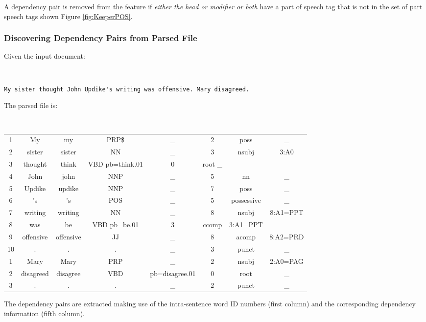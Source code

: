 \documentclass[11pt]{article}
\begin{document}
A dependency pair is removed from the feature if \emph{either the head or modifier or both} have a part of speech tag that is not in the set of part speech tags shown Figure \ref{fig:KeeperPOS}.

\subsubsection{Discovering Dependency Pairs from Parsed File} \label{sec:Discover}


Given the input document:

\begin{shaded} \tt
\begin{verbatim}
My sister thought John Updike's writing was offensive. Mary disagreed.
\end{verbatim}
\end{shaded}

The parsed file is:

\begin{shaded} \tt
\footnotesize
\begin{tabular}{cccccccc}
1 &	My &	my &	PRP\$ &	 \_	& 2	 & poss	 &\_ \\
2 &	sister &	sister &	NN &	\_ &	3 &	nsubj &	3:A0 \\
3 &	thought &	think &	VBD	pb=think.01 &	0 &	root	\_ \\
4 &	John &	john	 &NNP &	\_ &	5 &	nn &	 \_ \\
5 &	Updike &	updike &	 NNP &	\_ &	7 &	poss & \_ \\
6 &	's &	's &	POS	 &\_ &	5 &	possessive &	\_ \\
7 &	writing &	writing &	NN &	\_ &	8 &	nsubj &	8:A1=PPT \\
8 &	was &	be &	VBD	pb=be.01 &	3 &	 ccomp &	3:A1=PPT \\
9 &	offensive &	offensive &	JJ & \_	& 8 &	acomp &	8:A2=PRD \\
10 & 	. & 	. &	. &	\_ &	3 &	punct &	\_ \\

1 &	Mary &	Mary &	PRP	 & \_	 & 2	 & nsubj &	2:A0=PAG \\
2 &	disagreed &	disagree &	VBD	 & pb=disagree.01 & 	0 & 	root	 & \_ \\
3 &	. &	. &	. &	\_ &	2 &	punct &	\_ \\
\end{tabular}
\end{shaded}

The dependency pairs are extracted making use of the intra-sentence word ID numbers (first column) and the corresponding dependency information (fifth column).
\end{document}
